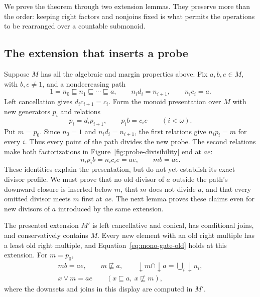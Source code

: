We prove the theorem through two extension lemmas.  They preserve more
than the order: keeping right factors and nonjoins fixed is what permits
the operations to be rearranged over a countable submonoid.

\subsection{The extension that inserts a probe}

Suppose $M$ has all the algebraic and margin properties above.
Fix $a,b,e\in M$, with $b,e\ne1$, and a nondecreasing path
\begin{equation}\label{eq:mono-path}
 1=n_0\sqsubseteq n_1\sqsubseteq\cdots\sqsubseteq a,
 \qquad n_id_i=n_{i+1},\qquad n_ic_i=a.
\end{equation}
Left cancellation gives $d_ic_{i+1}=c_i$.
Form the monoid presentation over $M$ with new generators $p_i$ and
relations
\begin{equation}\label{eq:mono-probe-relations}
 p_i=d_ip_{i+1},\qquad p_ib=c_ie\qquad(i<\omega).
\end{equation}
Put $m=p_0$.  Since $n_0=1$ and $n_id_i=n_{i+1}$, the first
relations give $n_ip_i=m$ for every $i$.  Thus every point of the path
divides the new probe.  The second relations make both factorizations
in Figure~\ref{fig:probe-divisibility} end at $ae$:
\[
 n_ip_ib=n_ic_ie=ae,\qquad mb=ae.
\]
These identities explain the presentation, but do not yet establish
its exact divisor profile.  We must prove that no old divisor of $a$
outside the path's downward closure is inserted below $m$, that $m$
does not divide $a$, and that every omitted divisor meets $m$ first
at $ae$.  The next lemma proves these
claims even for new divisors of $a$ introduced by the same extension.



\begin{lemma}\label{lem:mono-probe-algebra}
The presented extension $M'$ is left cancellative and conical, has
conditional joins, and conservatively contains $M$.  Every new element
with an old right multiple has a least old right multiple, and
Equation~\eqref{eq:mono-gate-old} holds at this extension.
For $m=p_0$,
\begin{equation}\label{eq:mono-probe-profile}
 \begin{gathered}
 mb=ae,\qquad m\not\sqsubseteq a,\qquad
 \downarrow m\cap\downarrow a=\bigcup_i\downarrow n_i,\\
 x\vee m=ae\qquad
 (x\sqsubseteq a,\ x\not\sqsubseteq m),
 \end{gathered}
\end{equation}
where the downsets and joins in this display are computed in $M'$.
\end{lemma}

